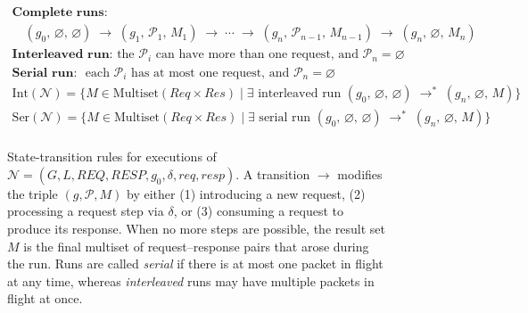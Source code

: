 \begin{figure}[H]
    \[
    \begin{array}{c}
    \textbf{Complete runs:}
    \\
    \quad (g_0,\,\varnothing,\,\varnothing) \;\longrightarrow\; (g_1,\,\mathcal{P}_1,\,M_1) \;\longrightarrow\; \cdots \;\longrightarrow\; (g_n,\,\mathcal{P}_{n-1},\,M_{n-1}) \;\longrightarrow\; (g_n,\,\varnothing,\,M_n)
    \\[1em]
    \textbf{Interleaved run: } \text{the } \mathcal{P}_i \text{ can have more than one request, and } \mathcal{P}_n = \varnothing \\
    \textbf{Serial run: } \text{ each } \mathcal{P}_i \text{ has at most one request, and } \mathcal{P}_n = \varnothing\\
    \text{Int}(\mathcal{N}) = \{ M \in \text{Multiset}(\mathit{Req} \times \mathit{Res}) \mid \exists \text{ interleaved run } (g_0,\,\varnothing,\,\varnothing) \;\longrightarrow^*\; (g_n,\,\varnothing,\,M) \}\\
    \text{Ser}(\mathcal{N}) = \{ M \in \text{Multiset}(\mathit{Req} \times \mathit{Res}) \mid \exists \text{ serial run } (g_0,\,\varnothing,\,\varnothing) \;\longrightarrow^*\; (g_n,\,\varnothing,\,M) \}\\
    \end{array}
    \]

    \caption{State-transition rules for executions of
    \(\mathcal{N} = (G, L, \mathit{REQ}, \mathit{RESP}, g_0, \delta, \mathit{req}, \mathit{resp})\).
    A transition \(\longrightarrow\) modifies the triple \((g,\mathcal{P},M)\) by either (1) introducing a new request, (2) processing a request step via \(\delta\), or (3) consuming a request to produce its response.  When no more steps are possible, the result set \(M\) is the final multiset of request--response pairs that arose during the run.
    Runs are called \emph{serial} if there is at most one packet in flight at any time, whereas \emph{interleaved} runs may have multiple packets in flight at once.}
    \label{fig:network-transitions}
\end{figure}


